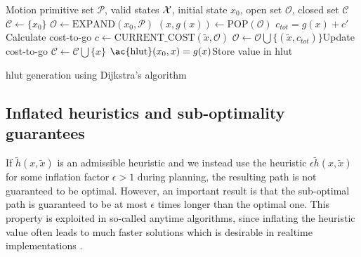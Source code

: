 \begin{algorithm}
    \begin{algorithmic}
        \Require Motion primitive set $\mathcal{P}$, valid states $\mathcal{X}$, initial state $x_0$, open set $\mathcal{O}$, closed set $\mathcal{C}$
            \State $\mathcal{C}\gets \{x_0\}$
            \State $\mathcal{O}\gets\text{EXPAND}(x_0, \mathcal{P})$
                \State $(x,g(x))\gets \text{POP}(\mathcal{O})$
                        \State $c_{tot}=g(x) + c'$ \Comment Calculate cost-to-go
                        \State $c\gets\text{CURRENT\_COST}(\tilde{x}, \mathcal{O})$
                            \State $\mathcal{O}\gets\mathcal{O}\bigcup\{(\tilde{x},c_{tot})\}$\Comment Update cost-to-go
                        \EndIf
                    \EndIf
                \EndFor
            \State $\mathcal{C}\gets\mathcal{C}\bigcup \{x\}$
            \State $\text{\ac{hlut}}(x_0,x)=g(x)$\Comment Store value in \ac{hlut}
            \EndWhile
        \end{algorithmic}
        \caption{\ac{hlut} generation using Dijkstra's algorithm}
        \label{alg:hlut}
\end{algorithm}

\subsection{Inflated heuristics and sub-optimality guarantees}\label{sec:sub_optimal}
If $\tilde{h}(x, \tilde{x})$ is an admissible heuristic and we instead use the heuristic $\epsilon \tilde{h}(x, \tilde{x})$ for some inflation factor $\epsilon>1$ during planning,
the resulting path is not guaranteed to be optimal. However, an important result is that the sub-optimal path is guaranteed to be at most $\epsilon$ times 
longer than the optimal one. This property is exploited in so-called anytime algorithms, since inflating the heuristic value often leads to much faster solutions which is 
desirable in realtime implementations \cite{anytime_astar}. 